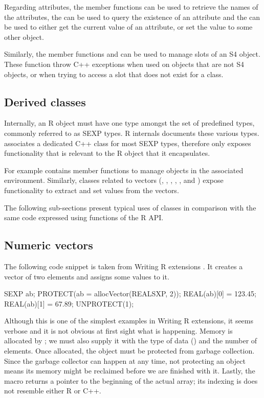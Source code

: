 Regarding attributes, the member functions 
 can be used to retrieve the names of the attributes, 
the  can be used to query the existence of an attribute and 
the  can be used to either get the current value of an 
attribute, or set the value to some other object.

Similarly, the member functions  and 
can be used to manage slots of an S4 object. These function throw 
C++ exceptions when used on objects that are not S4 objects, or when 
trying to access a slot that does not exist for a class.

\subsection{Derived classes}

Internally, an R object must have one type amongst the set of 
predefined types, commonly referred to as SEXP types. R internals
\citep{R:ints} documents these various types. 
 associates a dedicated C++ class for most SEXP types, 
therefore only exposes functionality that is relevant to the R object
that it encapsulates.

For example  contains 
member functions to manage objects in the associated environment. 
Similarly, classes related to vectors (, , 
, , , 
 and ) expose functionality
to extract and set values from the vectors.

The following sub-sections present typical uses of  classes in
comparison with the same code expressed using functions of the R API.

\subsection{Numeric vectors}

The following code snippet is taken from Writing R extensions
\citep{R:exts}. It creates a  vector of two elements 
and assigns some values to it. 

\begin{example}
SEXP ab;
PROTECT(ab = allocVector(REALSXP, 2));
REAL(ab)[0] = 123.45;
REAL(ab)[1] = 67.89;
UNPROTECT(1);
\end{example}

Although this is one of the simplest examples in Writing R extensions, 
it seems verbose and it is not obvious at first sight what is happening.
Memory is allocated by ; we must also supply it with
the type of data () and the number of elements.  Once
allocated, the  object must be protected from garbage
collection. Since the garbage collector can happen at any time, not
protecting an object means its memory might be reclaimed before we are
finished with it. Lastly, the  macro returns a pointer to the
beginning of the actual array; its indexing is does not resemble either R or
C++.

